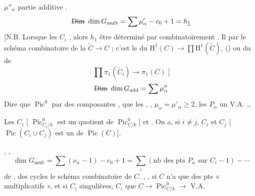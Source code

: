 \documentclass[11pt,a4paper]{article}
\begin{document}
$\mu''_\alpha$ partie additive \struck{\ill{}}.
\[
  \text{\struck{Dim}}\ \dim G_{\mathrm{mult}} = \sum \mu'_\alpha - c_0 + 1 = h_{\underline{1}}
\]
[N.B. Lorsque les $C_i$ \struck{\ill{}} \add{\ill{}} \struck{\ill{}}, alors $h_1$ \struck{\ill{}}  être déterminé par combinatoirement  \struck{\ill{}}. Il  \ill{} par le schéma combinatoire de la  \ill{} $\widetilde{C} \to C$ ; c'est \ill{} le  \ill{} du \ill{} $\mathrm{H}^1(C) \to \prod \mathrm{H}^1(\widetilde{C})$, () ou du  de
\[
  \prod \pi_1(\widetilde{C}_i) \to \pi_1(C) \;]
\]
\[
  \text{\struck{Dim}}\ \dim G_{\mathrm{add}} = \sum \mu''_\alpha
\]
Dire que $\operatorname{Pic}^0$ \ill{} par des composantes  \ill{},  que les  , \struck{\ill{}},  $\mu_\alpha = \mu'_\alpha \geq 2$,  \ill{}  les $P_\alpha$   \ill{}   un V.A. \struck{\ill{}} \add{\ill{}}  \struck{\ill{}} …

 Les $C_i$ \struck{\ill{}} 
[ $\operatorname{Pic}^0_{C_i/k}$ est un quotient de $\operatorname{Pic}^0_{C/k}$] et 
.
On a, si $i \neq j$,  $C_i$ et $C_j$   \ill{} \ill{}  \ill{}  
[ $\operatorname{Pic}(C_i \cup C_j)$ est un  de $\operatorname{Pic}(C)$]. \struck{\ill{} $\nu_\alpha$ \ill{}}

, \uncertain{\ill{}}    ,
\[
  \dim G_{\mathrm{mult}} = \sum (\nu_\alpha - 1) - c_0 + 1
  = \sum_i (\text{nb des pts } P_\alpha \text{ sur } C_i - 1) - \cdots
\]
  de ,    \ill{} \ill{}   des cycles
 le schéma combinatoire de $C$. \struck{\ill{}},
, si $C$ n'a que des pts \struck{\ill{}}  « multiplicatifs », et si  $C_i$  \ill{}  singulières, \ill{}      \ill{}  $C_i$ que $C \to \operatorname{Pic}^0_{C/k} \to$ \ill{}  V.A.
\end{document}
